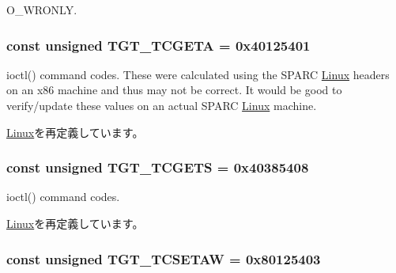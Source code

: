 O\_\-WRONLY. \hypertarget{classSparcLinux_a804fc265279c5dbd78e0f95da998b267}{
\subsubsection[{TGT\_\-TCGETA}]{\setlength{\rightskip}{0pt plus 5cm}const unsigned {\bf TGT\_\-TCGETA} = 0x40125401}}
\label{classSparcLinux_a804fc265279c5dbd78e0f95da998b267}
ioctl() command codes. These were calculated using the SPARC \hyperlink{classLinux}{Linux} headers on an x86 machine and thus may not be correct. It would be good to verify/update these values on an actual SPARC \hyperlink{classLinux}{Linux} machine. 

\hyperlink{classLinux_a804fc265279c5dbd78e0f95da998b267}{Linux}を再定義しています。\hypertarget{classSparcLinux_a50e5d880569ec2cb9a2f3d4aaa55cc64}{
\subsubsection[{TGT\_\-TCGETS}]{\setlength{\rightskip}{0pt plus 5cm}const unsigned {\bf TGT\_\-TCGETS} = 0x40385408}}
\label{classSparcLinux_a50e5d880569ec2cb9a2f3d4aaa55cc64}


ioctl() command codes. 

\hyperlink{classLinux_a50e5d880569ec2cb9a2f3d4aaa55cc64}{Linux}を再定義しています。\hypertarget{classSparcLinux_a96e06e042526ea5e89c4e8a020636c52}{
\subsubsection[{TGT\_\-TCSETAW}]{\setlength{\rightskip}{0pt plus 5cm}const unsigned {\bf TGT\_\-TCSETAW} = 0x80125403}}
\label{classSparcLinux_a96e06e042526ea5e89c4e8a020636c52}


